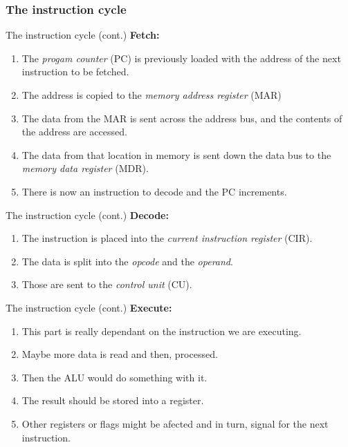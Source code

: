 \documentclass[aspectratio=169]{beamer}
\begin{document}
\subsubsection{The instruction cycle}
\begin{frame}{The instruction cycle (cont.)}
  \textbf{\large Fetch:}
  \begin{enumerate}
    \item <2-> The \textit{progam counter} (PC) is previously loaded with the address of the next instruction to be fetched.
    \item <3-> The address is copied to the \textit{memory address register} (MAR)
    \item <4-> The data from the MAR is sent across the address bus, and the contents of the address are accessed.
    \item <5-> The data from that location in memory is sent down the data bus to the \textit{memory data register} (MDR). 
    \item <6-> There is now an instruction to decode and the PC increments.
  \end{enumerate}
\end{frame}

\begin{frame}{The instruction cycle (cont.)}
  \textbf{\large Decode:}
  \begin{enumerate}
        \item <2-> The instruction is placed into the \textit{current instruction register} (CIR).
        \item <3-> The data is split into the \textit{opcode} and the \textit{operand}.
        \item <4-> Those are sent to the \textit{control unit} (CU).
  \end{enumerate}
\end{frame}

\begin{frame}{The instruction cycle (cont.)}
  \textbf{\large Execute:}
  \begin{enumerate}
        \item <2-> This part is really dependant on the instruction we are executing.
        \item <3-> Maybe more data is read and then, processed.
        \item <4-> Then the ALU would do something with it.
        \item <5-> The result should be stored into a register.
        \item <6-> Other registers or flags might be afected and in turn, signal for the next instruction.
  \end{enumerate}
\end{frame}
\end{document}
